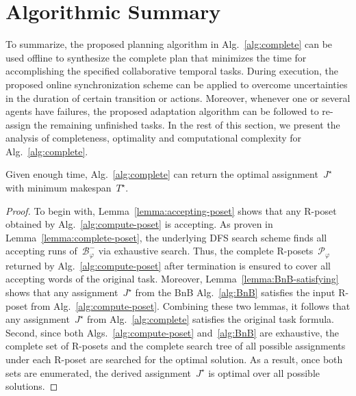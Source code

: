 \section{Algorithmic Summary}\label{subsec:summary}

To summarize, the proposed planning algorithm in Alg.~\ref{alg:complete}
can be used offline to synthesize the complete plan that
minimizes the time for accomplishing the specified collaborative temporal tasks.
During execution, the proposed online synchronization scheme can be applied to
overcome uncertainties in the duration of certain transition or actions.
Moreover, whenever one or several agents have failures, the proposed adaptation
algorithm can be followed to re-assign the remaining unfinished tasks.
In the rest of this section,
we present the analysis of completeness, optimality and computational
complexity for Alg.~\ref{alg:complete}.

\begin{theorem}[Completeness]\label{theo:completeness}
Given enough time, Alg.~\ref{alg:complete} can return the optimal
assignment~$J^\star$ with minimum makespan~$T^\star$.
\end{theorem}
\begin{proof}
 To begin with, Lemma~\ref{lemma:accepting-poset} shows that any R-poset obtained
 by Alg.~\ref{alg:compute-poset} is accepting.
 As proven in Lemma~\ref{lemma:complete-poset},
 the underlying DFS search scheme finds all accepting runs of~$\mathcal{B}^-_{\varphi}$ via exhaustive search.
 Thus, the complete R-posets~$\mathcal{P}_{\varphi}$ returned by
 Alg.~\ref{alg:compute-poset} after termination is ensured to cover all
 accepting words of the original task.
 Moreover, Lemma~\ref{lemma:BnB-satisfying} shows that any assignment~$J^\star$
 from the BnB Alg.~\ref{alg:BnB} satisfies the input R-poset
 from Alg.~\ref{alg:compute-poset}.
 Combining these two lemmas, it follows that any assignment~$J^\star$
 from Alg.~\ref{alg:complete} satisfies the original task formula.
 Second, since both Algs.~\ref{alg:compute-poset} and~\ref{alg:BnB} are exhaustive,
 the complete set of R-posets and the complete search tree of all
 possible assignments under each R-poset are searched for the optimal solution.
 As a result, once both sets are enumerated, the derived assignment~$J^\star$ is
 optimal over all possible solutions.
\end{proof}

